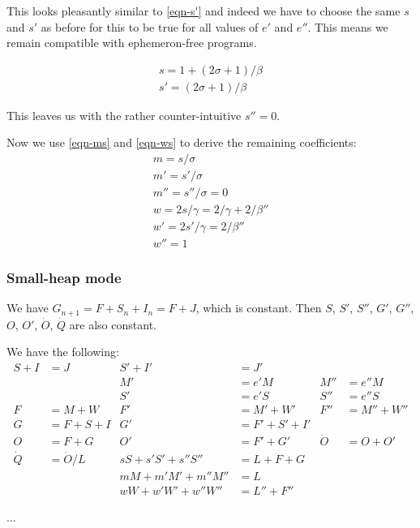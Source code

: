 \documentclass{article}
\begin{document}
This looks pleasantly similar to \eqref{eqn-s'} and indeed we
have to choose the same $s$ and $s'$ as before for this to be true for
all values of $e'$ and $e''$. This means we remain compatible with
ephemeron-free programs.

\begin{gather}
s = 1 + (2\sigma + 1)/\beta \\
s' = (2\sigma + 1)/\beta
\end{gather}

This leaves us with the rather counter-intuitive $s'' = 0$.

\bigskip

Now we use \eqref{eqn-ms} and \eqref{eqn-ws} to derive the remaining
coefficients:
\begin{gather}
m = s/\sigma \\
m' = s'/\sigma \\
m'' = s''/\sigma = 0 \\
w = 2s/\gamma = 2/\gamma + 2/\beta''\\
w' = 2s'/\gamma = 2/\beta''\\
w'' = 1
\end{gather}


\subsubsection{Small-heap mode}


We have $G_{n+1} = F + S_n + I_n = F + J$, which is constant. Then $S$,
$S'$, $S''$, $G'$, $G''$, $O$, $O'$, $\dot{O}$, $\dot{Q}$
are also constant.

We have the following:
\begin{align*}
S+I &= J & S'+I' &= J' \\
 & & M' &= e'M  &  M'' &= e''M \\
 & & S' &= e'S  &  S'' &= e''S \\
F &= M + W  &  F' &= M' + W'  &  F'' &= M'' + W'' \\
G &= F + S + I  &  G' &= F' + S' + I' \\
O &= F + G  &  O' &= F' + G' & \dot{O} &= O + O' \\
\dot{Q} &= \dot{O}/L  & sS + s'S' + s''S'' &= L + F + G \\
             &         &  mM + m'M' + m''M'' &= L \\
             &         &  wW + w'W' + w''W'' &= L'' + F''
\end{align*}

...
\end{document}
